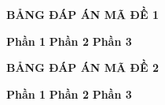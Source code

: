 \documentclass[12pt,a4paper]{article}
\begin{document}


\begin{center}
{\bf BẢNG ĐÁP ÁN MÃ ĐỀ 1 }
\end{center}
{\bf Phần 1 }
{\bf Phần 2 }
{\bf Phần 3 }
\begin{center}
{\bf BẢNG ĐÁP ÁN MÃ ĐỀ 2 }
\end{center}
{\bf Phần 1 }
{\bf Phần 2 }
{\bf Phần 3 }
\end{document}
